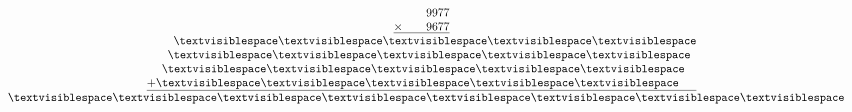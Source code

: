\begin{minipage}[t]{0.3\linewidth}
\begin{align*}\begin{array}{c}
\phantom{
\times0000
}
9977\\
\underline{
\times
\phantom{
0000
}
9677
}\\
\phantom{
+000
}
\textvisiblespace
\textvisiblespace
\textvisiblespace
\textvisiblespace
\textvisiblespace
\\
\phantom{
+00
}
\textvisiblespace
\textvisiblespace
\textvisiblespace
\textvisiblespace
\textvisiblespace
\phantom0\\
\phantom{
+0
}
\textvisiblespace
\textvisiblespace
\textvisiblespace
\textvisiblespace
\textvisiblespace
\phantom0\phantom0\\
\underline{
+
\textvisiblespace
\textvisiblespace
\textvisiblespace
\textvisiblespace
\textvisiblespace
\phantom0\phantom0\phantom0
}
\\
\phantom{+}
\textvisiblespace
\textvisiblespace
\textvisiblespace
\textvisiblespace
\textvisiblespace
\textvisiblespace
\textvisiblespace
\textvisiblespace
\end{array}\end{align*}
\end{minipage}
\begin{minipage}[t]{0.05\linewidth}
\begin{align*}\begin{array}{c}
\textvisiblespace
\\
\textvisiblespace
\\
\textvisiblespace
\\
\textvisiblespace
\\
\textvisiblespace
\\
\textvisiblespace
\\
\textvisiblespace
\end{array}\end{align*}
\end{minipage}
\begin{minipage}[t]{0.05\linewidth}
\begin{align*}\begin{array}{c}
\textvisiblespace
\\
\textvisiblespace
\\
\textvisiblespace
\\
\textvisiblespace
\\
\textvisiblespace
\\
\textvisiblespace
\\
\textvisiblespace
\end{array}\end{align*}
\end{minipage}
